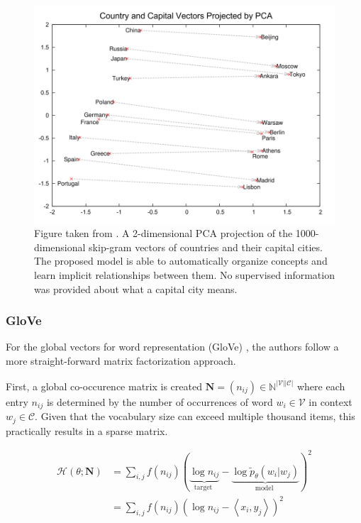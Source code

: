 \documentclass[a4paper,12pt,twoside,openright]{report}
\begin{document}
\begin{figure}[h]
	\center
  \includegraphics[width=0.6\linewidth]{./assets/background/word2vec_cities.png}
  \caption{Figure taken from \cite{mikolov13b}. A 2-dimensional PCA projection of the 1000-dimensional skip-gram vectors of countries and their capital cities. The proposed model is able to automatically organize concepts and learn implicit relationships between them. No supervised information was provided about what a capital city means.}
  \label{fig:cbow_skipgram}
\end{figure}


\subsubsection{GloVe}

For the global vectors for word representation (GloVe) \cite{pennington14}, the authors follow a more straight-forward matrix factorization approach.

First, a global co-occurence matrix is created $\mathbf{N} = (n_{ij}) \in \mathbb{N}^{|\mathcal{V}| \dot |\mathcal{C}|}$ where each entry $n_{ij}$ is determined by the number of occurrences of word $w_i \in \mathcal{V}$ in context $w_j \in \mathcal{C}$.
Given that the vocabulary size can exceed multiple thousand items, this practically results in a sparse matrix.

\begin{align}
\mathcal{H}(\theta ; \mathbf{N}) &=
\sum_{i, j} f\left(n_{i j}\right)(\underbrace{\log n_{i j}}_{\text {target }}-\underbrace{\log \tilde{p}_{\theta}\left(w_{i} | w_{j}\right)}_{\text {model }})^{2} \\
&= \sum_{i, j} f\left(n_{i j}\right)(\log n_{i j} - \left\langle x_i, y_j \right\rangle )^{2} \\
\end{align}
\end{document}
